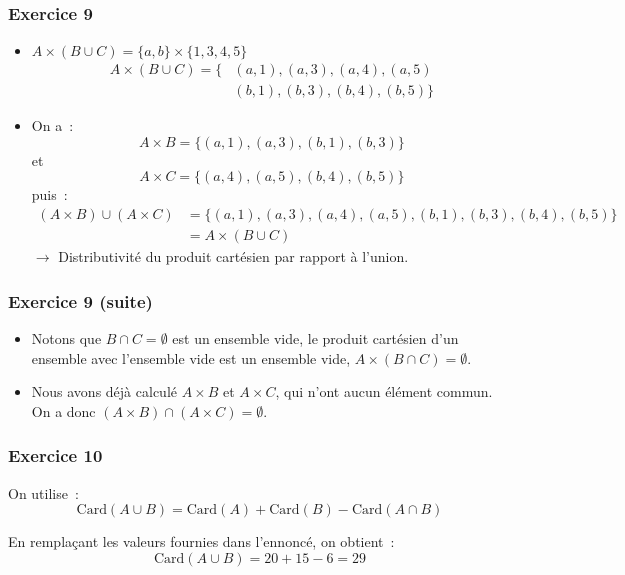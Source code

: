 \documentclass[10pt,notheorems]{beamer}
\theoremstyle{plain}
\theoremstyle{definition} %
\begin{document}
\begin{frame}
  \frametitle{Exercice 9}
  \fontsize{8}{10}\selectfont

  \begin{itemize}

  \item $A\times (B\cup C) = \{a,b\}\times\{1,3,4,5\}$
    \[
      \begin{split}
        A\times (B\cup C) = \bigl\{ &(a, 1), (a,3), (a, 4), (a, 5)\\
        &(b, 1), (b,3), (b, 4), (b, 5)\bigr\}
      \end{split}
    \]

  \item On a~:
    \[
      A\times B = \bigl\{ (a, 1), (a,3), (b, 1), (b,3)\bigr\}
    \]
    et
    \[
      A\times C = \bigl\{ (a, 4), (a,5), (b, 4), (b,5)\bigr\}
    \]
    puis~:
    \[
      \begin{split}
        (A\times B)\cup(A\times C) &= \bigl\{(a, 1), (a,3), (a, 4), (a, 5), (b, 1), (b,3), (b, 4), (b, 5)\bigr\}\\
        &= A\times (B\cup C)
      \end{split}
    \]
    $\rightarrow$ Distributivité du produit cartésien par rapport à l'union.
  \end{itemize}

\end{frame}


\begin{frame}
  \frametitle{Exercice 9 (suite)}
  \fontsize{8}{10}\selectfont

  \begin{itemize}

  \item Notons que $B\cap C = \emptyset$ est un ensemble vide, le produit cartésien d'un ensemble avec l'ensemble vide est un ensemble vide, $A\times (B\cap C) = \emptyset$.\newline

  \item Nous avons déjà calculé $A\times B$ et $A\times C$, qui n'ont aucun élément commun. On a donc
    $(A\times B)\cap(A\times C) = \emptyset$.
  \end{itemize}

\end{frame}


\begin{frame}
  \frametitle{Exercice 10}
  \fontsize{8}{10}\selectfont


  On utilise~:
    \[
      \textrm{Card}(A \cup B) = \textrm{Card}(A) + \textrm{Card}(B) - \textrm{Card}(A\cap B)
    \]

    En remplaçant les valeurs fournies dans l'ennoncé, on obtient~:
    \[
      \textrm{Card}(A \cup B) = 20+15-6 = 29
    \]

  \end{frame}
\end{document}
